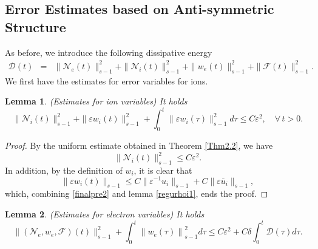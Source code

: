 \documentclass[reqno,twoside,12pt,a4paper]{amsart}
\newcommand{\eps}{\mathbb{\varepsilon}}
\newcommand{\calf}{\mathcal{F}}
\newcommand{\Ni}{\mathcal{N}_i}
\newcommand{\Ne}{\mathcal{N}_e}
\newtheorem{lemma}{Lemma}[section]
\numberwithin{equation}{section}
\begin{document}
\subsection{Error Estimates based on Anti-symmetric Structure}
As before, we introduce the following dissipative energy
\begin{eqnarray*}
\mathcal{D}(t)&=&\|\Ne(t)\|_{s-1}^2+\|\Ni(t)\|_{s-1}^2+\|w_e(t)\|_{s-1}^2+\|\calf(t)\|_{s-1}^2.
\end{eqnarray*}
We first have the estimates for error variables for ions.
\begin{lemma}(Estimates for ion variables) It holds
\begin{equation}\label{regui}
\|\Ni(t)\|_{s-1}^2+\|\eps w_i(t)\|_{s-1}^2+\int_0^t\|\eps w_i(\tau)\|_{s-1}^2d\tau\leq C\eps^2, \quad \forall\, t>0.
\end{equation}
\end{lemma}
\begin{proof} By the uniform estimate obtained in Theorem \ref{Thm2.2}, we have
\[
\|\Ni(t)\|_{s-1}^2\leq C\eps^2. 
\]
In addition, by the definition of $w_i$, it is clear that
\[
\|\eps w_i(t)\|_{s-1}\leq C\|\eps^{-1} u_i\|_{s-1}+C\|\eps \bar{u}_i\|_{s-1},
\]
which, combining \eqref{finalpre2} and lemma \ref{regurhoi1}, ends the proof. 
\end{proof}

\begin{lemma}\label{14} (Estimates for electron variables) It holds
\begin{equation}\label{regue}
    \|(\Ne,w_e,\mathcal{F})(t)\|_{s-1}^2 + \int_{0}^{t}\left\|w_e(\tau)\right\|^2_{s-1} d\tau 
    \leq  C\eps^2+C\delta\int_0^t\mathcal{D}(\tau)d\tau.
\end{equation}
\end{lemma}
\end{document}
